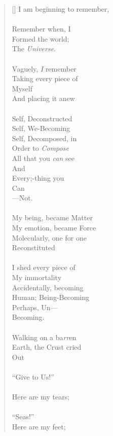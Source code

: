 \documentclass{article}
\begin{document}
\settowidth{\versewidth}{Than Tycho Brahe, or Erra Pater:}
\begin{verse}[\versewidth]
I am beginning to remember, \\
\\
Remember when, I \\
Formed the world; \\
The \textit{Universe}. \\
\\
Vaguely, \textit{I} remember \\
Taking every piece of \\
Myself \\
And placing it anew \\
\\
Self, Deconstructed \\
Self, We-Becoming \\
Self, Decomposed, in \\
Order to \textit{Compose} \\
All that you \textit{can} see \\
And \\
Every;-thing you \\
Can \\
––Not. \\
\\
My being, became Matter \\
My emotion, became Force \\
Molecularly, one for one \\
Reconstituted \\
\\
I shed every piece of \\
My immortality \\
Accidentally, becoming \\
Human; Being-Becoming \\
Perhaps, Un–– \\
Becoming. \\
\\
Walking on a ba\textit{rr}en \\
Earth, the Crust cried \\
Out \\
\\
``Give to Us!'' \\
\\
Here are my tears; \\
\\
``Seas!'' \\
Here are my feet; \\

\end{verse}
\end{document}
